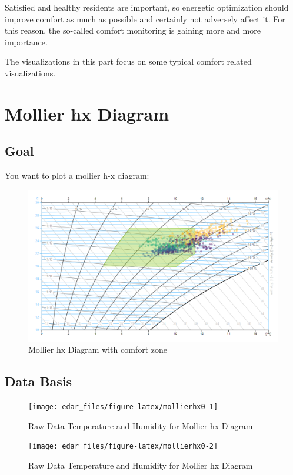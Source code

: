 \documentclass[
  a4paperpaper,
]{book}
\begin{document}
Satisfied and healthy residents are important, so energetic optimization should improve comfort as much as possible and certainly not adversely affect it. For this reason, the so-called comfort monitoring is gaining more and more importance.

The visualizations in this part focus on some typical comfort related visualizations.

\newpage

\hypertarget{mollier-hx-diagram}{%
\section{Mollier hx Diagram}\label{mollier-hx-diagram}}

\hypertarget{goal-18}{%
\subsection{Goal}\label{goal-18}}

You want to plot a mollier h-x diagram:

\begin{figure}
\includegraphics[width=0.7\linewidth]{images/comfortMollierHx} \caption{Mollier hx Diagram with comfort zone}\label{fig:unnamed-chunk-27}
\end{figure}

\hypertarget{data-basis-18}{%
\subsection{Data Basis}\label{data-basis-18}}

\begin{figure}
\texttt{[image: edar\_files/figure-latex/mollierhx0-1]} \caption{Raw Data Temperature and Humidity for Mollier hx Diagram}\label{fig:mollierhx0-1}
\end{figure}
\begin{figure}
\texttt{[image: edar\_files/figure-latex/mollierhx0-2]} \caption{Raw Data Temperature and Humidity for Mollier hx Diagram}\label{fig:mollierhx0-2}
\end{figure}
\end{document}
